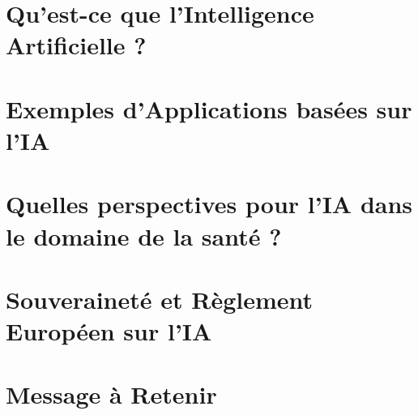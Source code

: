 %




\part[author={Concepts et Modèles Clés de l'IA dans les Applications Modernes}]{Qu'est-ce que l'Intelligence Artificielle ?}








\part[author={Principalement issus des Projets CIAD}]{Exemples d'Applications basées sur l'IA}







\part[author={IA et santé}]{Quelles perspectives pour l'IA dans le domaine de la santé ?}


\part[author={Le Point de Vue d'un Technologue}]{Souveraineté et Règlement Européen sur l'IA}


\part{Message à Retenir}


\appendix


\endinput
